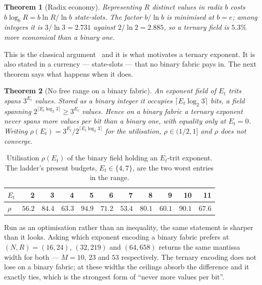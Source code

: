 \documentclass[11pt]{article}
\newtheorem{theorem}{Theorem}
\theoremstyle{definition}
\begin{document}
\begin{theorem}[Radix economy]
\label{thm:economy}
Representing $R$ distinct values in radix $b$ costs $b\log_b R = b\ln R/\ln b$
state-slots. The factor $b/\ln b$ is minimised at $b = e$; among integers it is
$3/\ln 3 = 2.731$ against $2/\ln 2 = 2.885$, so a ternary field is $5.3\%$ more
economical than a binary one.
\end{theorem}

This is the classical argument~\cite{hayes2001,radixeconomy} and it is what
motivates a ternary exponent. It is also stated in a currency --- state-slots ---
that no binary fabric pays in. The next theorem says what happens when it does.

\begin{theorem}[No free range on a binary fabric]
\label{thm:nofree}
An exponent field of $E_t$ trits spans $3^{E_t}$ values. Stored as a binary
integer it occupies $\lceil E_t\log_2 3\rceil$ bits, a field spanning
$2^{\lceil E_t\log_2 3\rceil} \geq 3^{E_t}$ values. Hence on a binary fabric a
ternary exponent never spans more values per bit than a binary one, with equality
only at $E_t = 0$. Writing $\rho(E_t) = 3^{E_t}/2^{\lceil E_t\log_2 3\rceil}$ for
the utilisation, $\rho \in (1/2, 1]$ and $\rho$ does not converge.
\end{theorem}

\begin{table}[t]\centering
\caption{Utilisation $\rho(E_t)$ of the binary field holding an $E_t$-trit
exponent. The ladder's present budgets, $E_t \in \{4, 7\}$, are the two worst
entries in the range.}
\label{tab:rho}
\begin{tabular}{lrrrrrrrrrr}
\toprule
$E_t$ & 2 & 3 & 4 & 5 & 6 & 7 & 8 & 9 & 10 & 11 \\
\midrule
$\rho$ & $56.2$ & $84.4$ & $\mathbf{63.3}$ & $94.9$ & $71.2$ & $\mathbf{53.4}$ & $80.1$ & $60.1$ & $90.1$ & $67.6$ \\
\bottomrule
\end{tabular}
\end{table}

Run as an optimisation rather than an inequality, the same statement is sharper
than it looks. Asking which exponent encoding a binary fabric prefers at
$(N, R) = (16, 24)$, $(32, 219)$ and $(64, 658)$ returns the same mantissa width
for both --- $M = 10$, $23$ and $53$ respectively. The ternary encoding does not
lose on a binary fabric; at these widths the ceilings absorb the difference and it
exactly ties, which is the strongest form of ``never more values per bit''.
\end{document}

